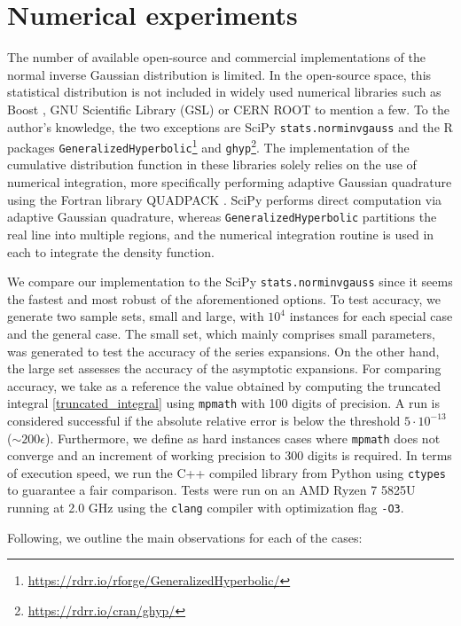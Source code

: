 \documentclass[10pt,a4paper,oneside]{article}
\numberwithin{equation}{section}
\begin{document}
\section{Numerical experiments}
The number of available open-source and commercial implementations of the normal inverse Gaussian distribution is limited. In the open-source space, this statistical distribution is not included in widely used numerical libraries such as Boost \cite{BoostLibrary}, GNU Scientific Library (GSL) \cite{GSL} or CERN ROOT \cite{ROOT} to mention a few. To the author's knowledge, the two exceptions are SciPy \texttt{stats.norminvgauss} \cite{scipy} and the R packages \texttt{GeneralizedHyperbolic}\footnote{\url{https://rdrr.io/rforge/GeneralizedHyperbolic/}} and \texttt{ghyp}\footnote{\url{https://rdrr.io/cran/ghyp/}}. The implementation of the cumulative distribution function in these libraries solely relies on the use of numerical integration, more specifically performing adaptive Gaussian quadrature using the Fortran library QUADPACK \cite{QUADPACK}. SciPy performs direct computation via adaptive Gaussian quadrature, whereas \texttt{GeneralizedHyperbolic} partitions the real line into multiple regions, and the numerical integration routine is used in each to integrate the density function.

We compare our implementation to the SciPy \texttt{stats.norminvgauss} since it seems the fastest and most robust of the aforementioned options. To test accuracy, we generate two sample sets, small and large, with $10^4$ instances for each special case and the general case. The small set, which mainly comprises small parameters, was generated to test the accuracy of the series expansions. On the other hand, the large set assesses the accuracy of the asymptotic expansions. For comparing accuracy, we take as a reference the value obtained by computing the truncated integral \eqref{truncated_integral} using \texttt{mpmath} with 100 digits of precision. A run is considered successful if the absolute relative error is below the threshold $5\cdot 10^{-13}$ ($\sim 200 \epsilon$).
Furthermore, we define as hard instances cases where \texttt{mpmath} does not converge and an increment of working precision to 300 digits is required.  
In terms of execution speed, we run the C++ compiled library from Python using \texttt{ctypes} to guarantee a fair comparison. Tests were run on an AMD Ryzen 7 5825U running at 2.0 GHz using the \texttt{clang} compiler with optimization flag \texttt{-O3}.

Following, we outline the main observations for each of the cases:
\end{document}
